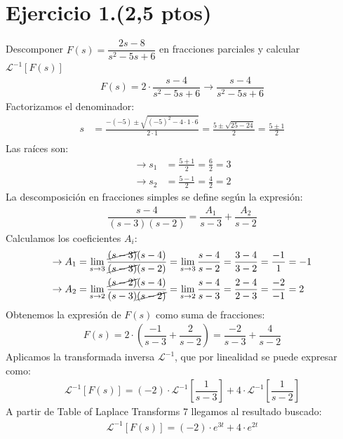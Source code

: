 \documentclass{article}
\begin{document}
\section*{Ejercicio 1.(2,5 ptos)}
Descomponer $F(s) = \dfrac{2s - 8}{s^2 - 5s + 6}$ en fracciones parciales y calcular $\mathcal{L}^{-1}[F(s)]$
\begin{align*}
    F(s) = 2\cdot\dfrac{s - 4}{s^2 - 5s + 6}\rightarrow \dfrac{s - 4}{s^2 - 5s + 6}
\end{align*}
Factorizamos el denominador:
\begin{align*}
    s &= \frac{-(-5) \pm \sqrt{(-5)^2 - 4\cdot1\cdot6}}{2\cdot1}
    = \frac{5 \pm \sqrt{25 - 24}}{2}
    = \frac{5 \pm 1}{2} \\
\end{align*}
Las raíces son:
\begin{align*}
    \rightarrow s_1 &= \frac{5 + 1}{2} = \frac{6}{2} = 3 \\
    \rightarrow s_2 &= \frac{5 - 1}{2} = \frac{4}{2} = 2
\end{align*}
La descomposición en fracciones simples se define según la expresión:
\begin{align*}
    \dfrac{s - 4}{(s - 3) (s - 2)} = \dfrac{A_1}{s - 3} + \dfrac{A_2}{s - 2}
\end{align*}
Calculamos los coeficientes $A_i$:
\begin{align*}
    \rightarrow A_1 
    &= \lim_{s \to 3} \dfrac{\cancel{(s - 3)} (s - 4)}{\cancel{(s - 3)}(s - 2)}
    = \lim_{s \to 3} \dfrac{s - 4}{s - 2}
    = \dfrac{3 - 4}{3 - 2}
    = \dfrac{-1}{1}
    = -1 \\
    \rightarrow A_2 
    &= \lim_{s \to 2} \dfrac{\cancel{(s - 2)} (s - 4)}{(s - 3) \cancel{(s - 2)}}
    = \lim_{s \to 2} \dfrac{s - 4}{s - 3}
    = \dfrac{2 - 4}{2 - 3}
    = \dfrac{-2}{-1}
    = 2
\end{align*}
Obtenemos la expresión de $F(s)$ como suma de fracciones:
\begin{align*}
    F(s) 
    = 2\cdot\left(\dfrac{-1}{s - 3} + \dfrac{2}{s - 2}\right)
    = \dfrac{-2}{s - 3} + \dfrac{4}{s - 2} 
\end{align*}
Aplicamos la transformada inversa $\mathcal{L}^{-1}$,
que por linealidad se puede expresar como:
\begin{align*}
    \mathcal{L}^{-1}[F(s)]
    = (-2)\cdot\mathcal{L}^{-1}\left[\dfrac{1}{s - 3}\right]
    + 4\cdot\mathcal{L}^{-1}\left[\dfrac{1}{s - 2}\right]
\end{align*}
A partir de Table of Laplace Transforms 7 llegamos al resultado buscado:
\begin{align*}
    \mathcal{L}^{-1}[F(s)]
    = (-2) \cdot e^{3t} + 4 \cdot e^{2t}
\end{align*}
\end{document}
